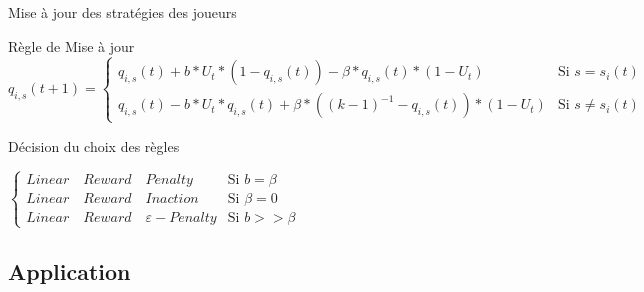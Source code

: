 \begin{frame}{Mise à jour des stratégies des joueurs}
    \begin{block}{Règle de Mise à jour}
    \fontsize{8pt}{15pt}
    $q_{i,s}(t+1)=\left\{
    \begin{array}{ll}
        q_{i,s}(t)+b*U_{t}*(1-q_{i,s}(t))-\beta*q_{i,s}(t)* (1-U_{t}) & \mbox{Si } s=s_i(t) \\
         q_{i,s}(t)-b*U_{t}*q_{i,s}(t)+\beta*((k-1)^{-1}- q_{i,s}(t))*(1-U_{t}) & \mbox{Si } s\neq s_i(t)
    \end{array}
\right.$
    \end{block}
    
    \begin{exampleblock}{Décision du choix des règles}
    
    $\left\{\begin{array}{ll}
    Linear\quad Reward\quad Penalty & \mbox{Si } b = \beta  \\
    Linear\quad Reward\quad Inaction & \mbox{Si } \beta = 0 \\
    Linear\quad Reward\quad \varepsilon-Penalty & \mbox{Si } b >> \beta 
    \end{array} 
    \right.$
    
    \end{exampleblock}
    
\end{frame}

\subsection{Application}

